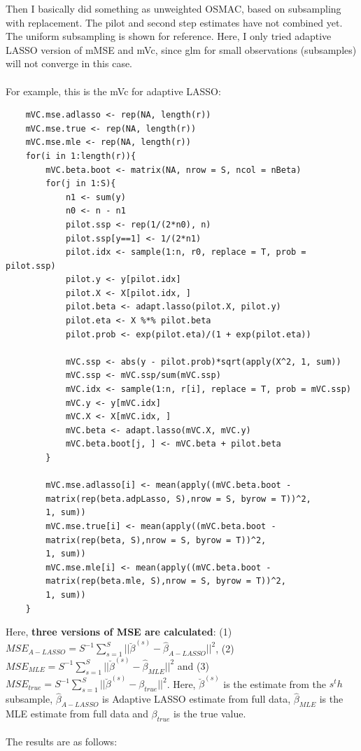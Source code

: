 \documentclass[]{article}
\begin{document}
Then I basically did something as unweighted OSMAC, based on subsampling with replacement. The pilot and second step estimates have not combined yet. The uniform subsampling is shown for reference. Here, I only tried adaptive LASSO version of mMSE and mVc, since glm for small observations (subsamples) will not converge in this case.\\
\\
For example, this is the mVc for adaptive LASSO:\\
\begin{lstlisting}
	mVC.mse.adlasso <- rep(NA, length(r))
	mVC.mse.true <- rep(NA, length(r))
	mVC.mse.mle <- rep(NA, length(r))
	for(i in 1:length(r)){
		mVC.beta.boot <- matrix(NA, nrow = S, ncol = nBeta)
		for(j in 1:S){
			n1 <- sum(y)
			n0 <- n - n1
			pilot.ssp <- rep(1/(2*n0), n)
			pilot.ssp[y==1] <- 1/(2*n1)
			pilot.idx <- sample(1:n, r0, replace = T, prob = pilot.ssp)
			pilot.y <- y[pilot.idx]
			pilot.X <- X[pilot.idx, ]
			pilot.beta <- adapt.lasso(pilot.X, pilot.y)
			pilot.eta <- X %*% pilot.beta
			pilot.prob <- exp(pilot.eta)/(1 + exp(pilot.eta))
			
			mVC.ssp <- abs(y - pilot.prob)*sqrt(apply(X^2, 1, sum))
			mVC.ssp <- mVC.ssp/sum(mVC.ssp)
			mVC.idx <- sample(1:n, r[i], replace = T, prob = mVC.ssp)
			mVC.y <- y[mVC.idx]
			mVC.X <- X[mVC.idx, ]
			mVC.beta <- adapt.lasso(mVC.X, mVC.y)
			mVC.beta.boot[j, ] <- mVC.beta + pilot.beta
		}
		
		mVC.mse.adlasso[i] <- mean(apply((mVC.beta.boot -
		matrix(rep(beta.adpLasso, S),nrow = S, byrow = T))^2,
		1, sum))
		mVC.mse.true[i] <- mean(apply((mVC.beta.boot -
		matrix(rep(beta, S),nrow = S, byrow = T))^2,
		1, sum))
		mVC.mse.mle[i] <- mean(apply((mVC.beta.boot -
		matrix(rep(beta.mle, S),nrow = S, byrow = T))^2,
		1, sum))
	}
\end{lstlisting}
Here, \textbf{three versions of MSE are calculated}: (1) $MSE_{A-LASSO}=S^{-1}\sum_{s=1}^{S}|| \breve{\beta}^{(s)} - \hat{\beta}_{A-LASSO}||^2$, (2) $MSE_{MLE}=S^{-1}\sum_{s=1}^{S}|| \breve{\beta}^{(s)} - \hat{\beta}_{MLE}||^2$ and (3) $MSE_{true}=S^{-1}\sum_{s=1}^{S}|| \breve{\beta}^{(s)} - \beta_{true}||^2$. Here, $\breve{\beta}^{(s)}$ is the estimate from the $s^th$ subsample, $\hat{\beta}_{A-LASSO}$ is Adaptive LASSO estimate from full data, $\hat{\beta}_{MLE}$ is the MLE estimate from full data and $\beta_{true}$ is the true value.\\
\\
The results are as follows:\\
\end{document}
